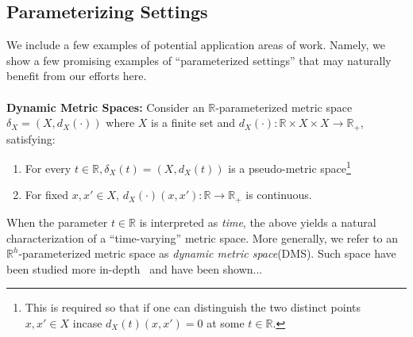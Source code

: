 \documentclass[12pt]{article}
\numberwithin{equation}{section}
\newcommand{\+}{%
	\raisebox{0.18ex}{\scaleobj{0.55}{+}}
}
\theoremstyle{definition}
\begin{document}
\subsection*{Parameterizing Settings}
We include a few examples of potential application areas of work. Namely, we show a few promising examples of ``parameterized settings'' that may naturally benefit from our efforts here.
\\
\\ 
\textbf{Dynamic Metric Spaces:} Consider an $\mathbb{R}$-parameterized metric space $\delta_X = ( X, d_X(\cdot) )$ where $X$ is a finite set and $d_X(\cdot): \mathbb{R} \times X \times X \to \mathbb{R}_{+}$, satisfying: 
\begin{enumerate}
	\item For every $t \in \mathbb{R}, \delta_X(t) = (X, d_X(t))$ is a pseudo-metric space\footnote{This is required so that if one can distinguish the two distinct points $x, x' \in X$ incase $d_X(t)(x, x') = 0$ at some $t \in \mathbb{R}$. } 
	\item For fixed $x, x' \in X$, $d_X(\cdot)(x, x'): \mathbb{R} \to \mathbb{R}_{+}$ is continuous.
\end{enumerate}
When the parameter $t \in \mathbb{R}$ is interpreted as \emph{time}, the above yields a natural characterization of a ``time-varying'' metric space. More generally, we refer to an $\mathbb{R}^h$-parameterized metric space as \emph{dynamic metric space}(DMS). 
Such space have been studied more in-depth~\cite{} and have been shown...


\end{document}
